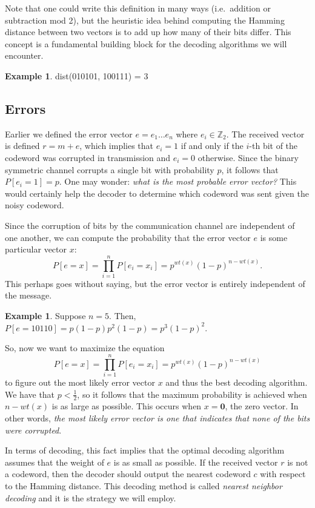 \documentclass[12pt,twoside]{reedthesis}
\theoremstyle{definition}
\newtheorem{example}[theorem]{Example}
\newcommand{\Z}{\mathbb{Z}}
\begin{document}
Note that one could write this definition in many ways (i.e.~addition or subtraction mod 2), but the heuristic idea behind computing the Hamming distance between two vectors is to add up how many of their bits differ. This concept is a fundamental building block for the decoding algorithms we will encounter.

\begin{example}
dist(010101, 100111) = 3
\end{example}

\subsection{Errors}
Earlier we defined the error vector $e = e_1 \ldots e_n$ where $e_i \in \Z_2$. The received vector is defined $r = m + e$, which implies that $e_i = 1$ if and only if the $i$-th bit of the codeword was corrupted in transmission and $e_i = 0$ otherwise. Since the binary symmetric channel corrupts a single bit with probability $p$, it follows that $P[e_i = 1] = p$.  One may wonder: \textit{what is the most probable error vector?} This would certainly help the decoder to determine which codeword was sent given the noisy codeword.

Since the corruption of bits by the communication channel are independent of one another, we can compute the probability that the error vector $e$ is some particular vector $x$:
\begin{equation} \label{p_error_vect}
P[e = x] = \prod_{i = 1}^{n} P[e_i = x_i] = p^{wt(x)}(1-p)^{n-wt(x)}.
\end{equation}
This perhaps goes without saying, but the error vector is entirely independent of the message.
\begin{example}
Suppose $n=5$. Then, $P[e = 10110] = p(1-p)p^2 (1-p) = p^3(1-p)^2$.
\end{example}
So, now we want to maximize the equation $$P[e = x] =  \prod_{i = 1}^{n} P[e_i = x_i] = p^{wt(x)}(1-p)^{n-wt(x)}$$ to figure out the most likely error vector $x$ and thus the best decoding algorithm. We have that $p < \frac{1}{2}$, so it follows that the maximum probability is achieved when $n-wt(x)$ is as large as possible. This occurs when $x = \mathbf{0}$, the zero vector. In other words, \textit{the most likely error vector is one that indicates that none of the bits were corrupted}.
 
 In terms of decoding, this fact implies that the optimal decoding algorithm assumes that the weight of $e$ is as small as possible. If the received vector $r$ is not a codeword, then the decoder should output the nearest codeword $c$ with respect to the Hamming distance. This decoding method is called \textit{nearest neighbor decoding} and it is the strategy we will employ.
\end{document}
